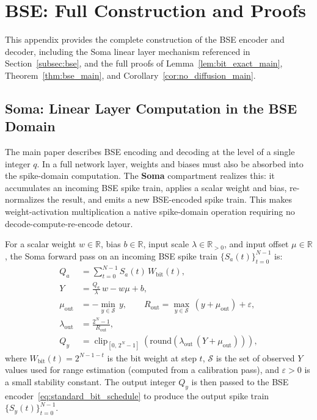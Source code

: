 \documentclass{article}
\theoremstyle{plain}
\theoremstyle{definition}
\theoremstyle{remark}
\begin{document}
\section{BSE: Full Construction and Proofs}
\label{app:bse_entropy_proof}

This appendix provides the complete construction of the BSE encoder and decoder,
including the Soma linear layer mechanism referenced in Section~\ref{subsec:bse},
and the full proofs of Lemma~\ref{lem:bit_exact_main},
Theorem~\ref{thm:bse_main}, and Corollary~\ref{cor:no_diffusion_main}.

\subsection{Soma: Linear Layer Computation in the BSE Domain}
\label{app:soma}

The main paper describes BSE encoding and decoding at the level of a single integer
$q$. In a full network layer, weights and biases must also be absorbed into the
spike-domain computation. The \textbf{Soma} compartment realizes this: it accumulates
an incoming BSE spike train, applies a scalar weight and bias, re-normalizes the
result, and emits a new BSE-encoded spike train. This makes weight-activation
multiplication a native spike-domain operation requiring no decode-compute-re-encode
detour.

For a scalar weight $w \in \mathbb{R}$, bias $b \in \mathbb{R}$, input scale
$\lambda \in \mathbb{R}_{>0}$, and input offset $\mu \in \mathbb{R}$, the Soma
forward pass on an incoming BSE spike train $\{S_a(t)\}_{t=0}^{N-1}$ is:
\begin{equation}
\label{eq:soma_def_app}
\begin{aligned}
Q_a &= \sum_{t=0}^{N-1} S_a(t)\,W_{\mathrm{bit}}(t), \\
Y   &= \frac{Q_a}{\lambda}\,w - w\mu + b, \\
\mu_{\mathrm{out}} &= -\min_{y \in \mathcal{S}}\,y,
\qquad
R_{\mathrm{out}} = \max_{y \in \mathcal{S}}\,(y + \mu_{\mathrm{out}}) + \varepsilon, \\
\lambda_{\mathrm{out}} &= \frac{2^N - 1}{R_{\mathrm{out}}}, \\
Q_y &= \operatorname{clip}_{[0,\,2^N-1]}\!\left(
         \mathrm{round}\!\left(\lambda_{\mathrm{out}}\,(Y + \mu_{\mathrm{out}})\right)
       \right),
\end{aligned}
\end{equation}
where $W_{\mathrm{bit}}(t) = 2^{N-1-t}$ is the bit weight at step $t$, $\mathcal{S}$
is the set of observed $Y$ values used for range estimation (computed from a
calibration pass), and $\varepsilon > 0$ is a small stability constant. The output
integer $Q_y$ is then passed to the BSE encoder~\eqref{eq:standard_bit_schedule} to
produce the output spike train $\{S_y(t)\}_{t=0}^{N-1}$.
\end{document}
